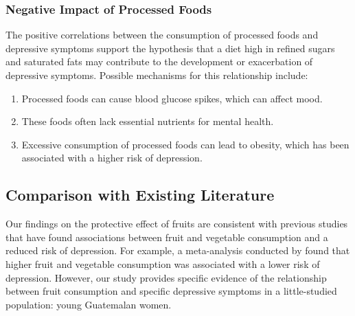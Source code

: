 \documentclass[jou]{apa7}
\begin{document}
\subsubsection{Negative Impact of Processed Foods}\label{impacto-negativo-de-alimentos-procesados}

The positive correlations between the consumption of processed foods and depressive symptoms support the hypothesis that a diet high in refined sugars and saturated fats may contribute to the development or exacerbation of depressive symptoms. Possible mechanisms for this relationship include:

\begin{enumerate}
	\item Processed foods can cause blood glucose spikes, which can affect mood.
	\item These foods often lack essential nutrients for mental health.
	\item Excessive consumption of processed foods can lead to obesity, which has been associated with a higher risk of depression.
\end{enumerate}



\subsection{Comparison with Existing Literature}\label{comparaciuxf3n-con-literatura-existente}

Our findings on the protective effect of fruits are consistent with previous studies that have found associations between fruit and vegetable consumption and a reduced risk of depression. For example, a meta-analysis conducted by \parencite{liuFruitVegetableConsumption2016} found that higher fruit and vegetable consumption was associated with a lower risk of depression. However, our study provides specific evidence of the relationship between fruit consumption and specific depressive symptoms in a little-studied population: young Guatemalan women.\\
\end{document}
